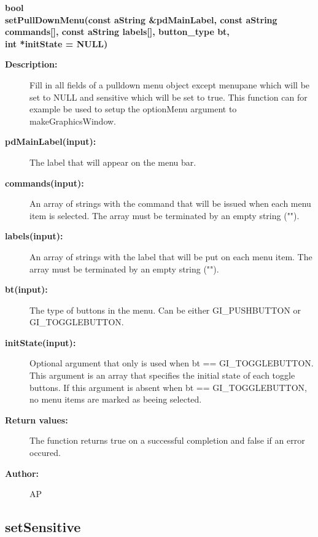 \begin{flushleft} \textbf{%
bool  \\ 
\settowidth{\DialogDataIncludeArgIndent}{setPullDownMenu(}%
setPullDownMenu(const aString \&pdMainLabel, const aString commands[], const aString labels[], button\_type bt, \\ 
\hspace{\DialogDataIncludeArgIndent}int *initState  = NULL)
}\end{flushleft}
\begin{description}
\item[{\bf Description:}]  Fill in all fields of a pulldown menu object except menupane which will be set to NULL 
   and sensitive which will be set to true.
   This function can for example be used to setup the optionMenu argument to makeGraphicsWindow.

\item[{\bf pdMainLabel(input):}]  The label that will appear on the menu bar.

\item[{\bf commands(input):}]  An array of strings with the command that will be issued when each menu
  item is selected. The array must be terminated by an empty string ("").

\item[{\bf labels(input):}]  An array of strings with the label that will be put on each menu
  item. The array must be terminated by an empty string ("").

\item[{\bf bt(input):}]  The type of buttons in the menu. Can be either GI\_PUSHBUTTON or GI\_TOGGLEBUTTON.

\item[{\bf initState(input):}]  Optional argument that only is used when bt == GI\_TOGGLEBUTTON. This argument
  is an array that specifies the initial state of each toggle buttons. If this argument is absent
  when bt == GI\_TOGGLEBUTTON, no menu items are marked as beeing selected.

\item[{\bf Return values:}]  The function returns true on a successful completion and false if an error occured.

\item[{\bf Author:}]  AP
\end{description}
\subsection{setSensitive}
 
